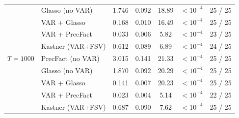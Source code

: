 \begin{table}[h!]
\begin{tabular}{llccccc}
           & Glasso (no VAR)    & 1.746 & 0.092 & 18.89 & $<10^{-4}$ & 25 / 25 \\
           & VAR + Glasso       & 0.168 & 0.010 & 16.49 & $<10^{-4}$ & 25 / 25 \\
           & VAR + PrecFact     & 0.033 & 0.006 &  5.82 & $<10^{-4}$ & 23 / 25 \\
           & Kastner (VAR+FSV)  & 0.612 & 0.089 &  6.89 & $<10^{-4}$ & 24 / 25 \\
\midrule
$T = 1000$ & PrecFact (no VAR)  & 3.015 & 0.141 & 21.33 & $<10^{-4}$ & 25 / 25 \\
           & Glasso (no VAR)    & 1.870 & 0.092 & 20.29 & $<10^{-4}$ & 25 / 25 \\
           & VAR + Glasso       & 0.141 & 0.007 & 20.23 & $<10^{-4}$ & 25 / 25 \\
           & VAR + PrecFact     & 0.023 & 0.004 &  5.14 & $<10^{-4}$ & 22 / 25 \\
           & Kastner (VAR+FSV)  & 0.687 & 0.090 &  7.62 & $<10^{-4}$ & 25 / 25 \\
\bottomrule
\end{tabular}
\end{table}

